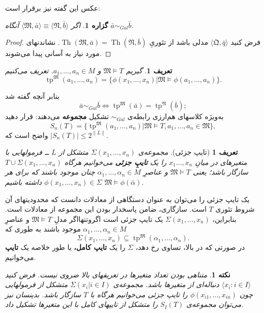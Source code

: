 \documentclass[12pt,a4paper]{article}
\theoremstyle{colorhead}
\newtheorem{prop}[thm]{گزاره}
\newtheorem{defn}[thm]{تعریف}
\newtheorem{nokte}[thm]{نکته}
\DeclareMathOperator{\Th}{Th}
\DeclareMathOperator{\tp}{tp}
\begin{document}
عکس این گفته نیز برقرار است:
\begin{prop}
اگر
$\langle \mathfrak{M},\bar{a}\rangle\equiv\langle \mathfrak{N},\bar{b}\rangle$
آنگاه
$\bar{a}\sim_{Gal}\bar{b}$.
\end{prop}
\begin{proof}
فرض کنید
$\langle \mathfrak{Q},\bar{q}\rangle$
مدلی باشد از تئوریِ
$\Th(\mathfrak{M},\bar{a})=\Th(\mathfrak{N},\bar{b})$.
نشاندنهای مورد نیاز به آسانی پیدا می‌شوند.
\end{proof}
\begin{defn}
گیریم 
$\mathfrak{M}\models T$
و
$a_1,\ldots,a_n\in M$.
تعریف می‌کنیم
\[
\tp^\mathfrak{M}(a_1,\ldots,a_n)=\{\phi(x_1,\ldots,x_n)|\mathfrak{M}\models
\phi(a_1,\ldots,a_n)\}.
\]
\end{defn}
بنابر آنچه گفته شد
\[
\bar{a}\sim_{Gal}\bar{b}\Leftrightarrow \tp^\mathfrak{M}(\bar{a})
=\tp^\mathfrak{N}(\bar{b});
\]
به‌ويژه کلاسهای هم‌ارزی رابطه‌ی 
$\sim_{Gal}$
تشکیل
\textbf{ مجموعه}
 می‌دهند: قرار دهید
 \[
 S_n(T)=\{\tp^\mathfrak{M}(a_1,\ldots,a_n)|
 \mathfrak{M}\models T, a_1,\ldots, a_n\in \mathfrak{M}\},
 \]
 واضح است که
 $|S_n(T)|\leq 2^{\|L\|}$.
\begin{defn}[تایپ جزئی]
مجموعه‌ی
$\Sigma(x_1,\ldots,x_n)$
متشکل از
$L$
ــ 
فرمولهایی با متغیرهای در میانِ
$x_1\ldots,x_n$
را 
یک
\textbf{تایپِ جزئی}
می‌خوانیم هرگاه
$T\cup \Sigma(x_1,\ldots,x_n)$
سازگار باشد؛ یعنی
$\mathfrak{M}\models T$
و عناصرِ
$\alpha_1,\ldots,\alpha_n\in M$
چنان موجود باشند که برای هر
$\phi(x_1,\ldots,x_n)\in \Sigma$
داشته باشیم
$\mathfrak{M}\models \phi(\bar{\alpha})$.
\end{defn}
یک تایپ جزئی را می‌توان به عنوان دستگاهی از معادلات دانست که محدودیتهای آن شروط تئوری
$T$
است. سازگاری، ضامن پاسخدار بودن این مجموعه از معادلات است. بنابراین،
$\Sigma(x_1,\ldots,x_n)$
یک تایپ جزئی است اگروتنهااگر مدلِ
$\mathfrak{M}\models T$
و عناصرِ
$\alpha_1,\ldots,\alpha_n\in M$
موجود باشند به طوری که
\[
\Sigma(x_1,\ldots,x_n)\subseteq \tp^\mathfrak{M}(\alpha_1,\ldots,\alpha_n).
\]
در صورتی که در بالا، تساوی رخ دهد، 
$\Sigma$
را یک
\textbf{تایپ کامل،}
 یا طور خلاصه یک 
\textbf{ تایپ}
  می‌خوانیم.
\begin{nokte}
متناهی بودن تعداد متغیرها در تعریفهای بالا ضروی نیست. فرض کنید
$\langle x_i:i\in I\rangle$
دنباله‌ای از متغیرها باشد. مجموعه‌ی
$\Sigma(x_i|i\in I)$
متشکل از فرمولهایی چون
$\phi(x_{i1},\ldots,x_{in})$
را تایپ جزئی می‌خوانیم هرگاه با
$T$
سازگار باشد.
بدینسان
نیز می‌توان
مجموعه‌ی
$S_I(T)$
را
متشکل از تایپهای کامل با این متغیرها  تشکیل داد. 
\end{nokte}
\end{document}
